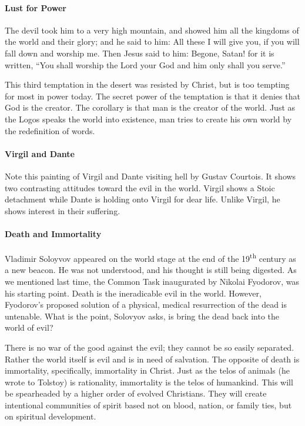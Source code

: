 \paragraph{Lust for Power}


\begin{quotex}
The devil took him to a very high mountain, and showed him all the kingdoms of the world and their glory; and he said to him: All these I will give you, if you will fall down and worship me. Then Jesus said to him: Begone, Satan! for it is written, ``You shall worship the Lord your God and him only shall you serve.''
\end{quotex}


This third temptation in the desert was resisted by Christ, but is too tempting for most in power today. The secret power of the temptation is that it denies that God is the creator. The corollary is that man is the creator of the world. Just as the Logos speaks the world into existence, man tries to create his own world by the redefinition of words.

\paragraph{Virgil and Dante}

Note this painting of Virgil and Dante visiting hell by Gustav Courtois. It shows two contrasting attitudes toward the evil in the world. Virgil shows a Stoic detachment while Dante is holding onto Virgil for dear life. Unlike Virgil, he shows interest in their suffering.

\paragraph{Death and Immortality}


Vladimir Soloyvov appeared on the world stage at the end of the 19\textsuperscript{th} century as a new beacon. He was not understood, and his thought is still being digested. As we mentioned last time, the Common Task inaugurated by Nikolai Fyodorov, was his starting point. Death is the ineradicable evil in the world. However, Fyodorov's proposed solution of a physical, medical resurrection of the dead is untenable. What is the point, Solovyov asks, is bring the dead back into the world of evil?

There is no war of the good against the evil; they cannot be so easily separated. Rather the world itself is evil and is in need of salvation. The opposite of death is immortality, specifically, immortality in Christ. Just as the telos of animals (he wrote to Tolstoy) is rationality, immortality is the telos of humankind. This will be spearheaded by a higher order of evolved Christians. They will create intentional communities of spirit based not on blood, nation, or family ties, but on spiritual development.

